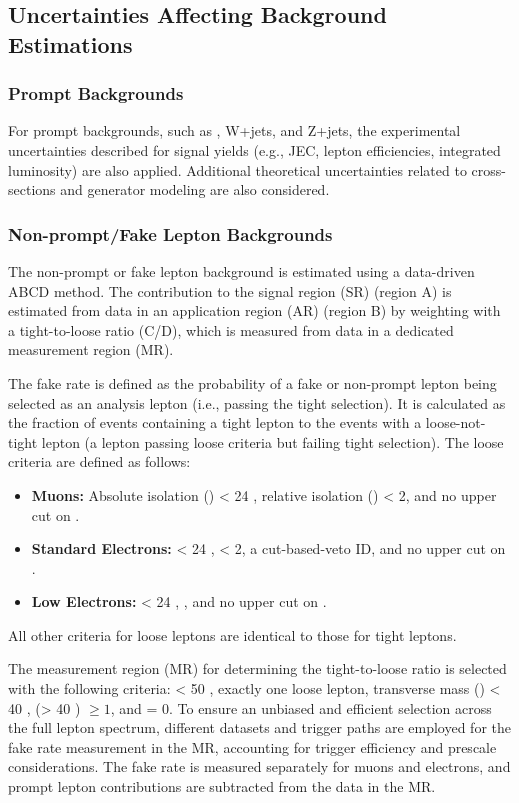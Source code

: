 \subsection{Uncertainties Affecting Background Estimations}

\subsubsection{Prompt Backgrounds}
For prompt backgrounds, such as \ttbar, W+jets, and Z+jets, the experimental uncertainties described for signal yields (e.g., JEC, lepton efficiencies, integrated luminosity) are also applied. Additional theoretical uncertainties related to cross-sections and generator modeling are also considered.

\subsubsection{Non-prompt/Fake Lepton Backgrounds}
The non-prompt or fake lepton background is estimated using a data-driven ABCD method. The contribution to the signal region (SR) (region A) is estimated from data in an application region (AR) (region B) by weighting with a tight-to-loose ratio (C/D), which is measured from data in a dedicated measurement region (MR).

The fake rate is defined as the probability of a fake or non-prompt lepton being selected as an analysis lepton (i.e., passing the tight selection). It is calculated as the fraction of events containing a tight lepton to the events with a loose-not-tight lepton (a lepton passing loose criteria but failing tight selection). The loose criteria are defined as follows:
\begin{itemize}
    \item \textbf{Muons:} Absolute isolation (\Isoabs) < 24 \GeV, relative isolation (\Isorel) < 2, and no upper cut on \dz.
    \item \textbf{Standard Electrons:} \Isoabs < 24 \GeV, \Isorel < 2, a cut-based-veto ID, and no upper cut on \dz.
    \item \textbf{Low \pt Electrons:} \Isoabs < 24 \GeV, , and no upper cut on \dz.
\end{itemize}
All other criteria for loose leptons are identical to those for tight leptons.

The measurement region (MR) for determining the tight-to-loose ratio is selected with the following criteria: \ETmiss < 50 \GeV, exactly one loose lepton, transverse mass (\MT) < 40 \GeV, \Njets(\pt > 40 \GeV) $\ge 1$, and \Nbtaggedjets = 0. To ensure an unbiased and efficient selection across the full lepton \pt spectrum, different datasets and trigger paths are employed for the fake rate measurement in the MR, accounting for trigger efficiency and prescale considerations. The fake rate is measured separately for muons and electrons, and prompt lepton contributions are subtracted from the data in the MR.

